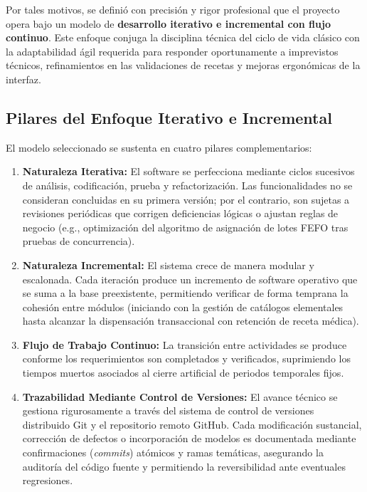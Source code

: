 Por tales motivos, se definió con precisión y rigor profesional que el proyecto opera bajo un modelo de \textbf{desarrollo iterativo e incremental con flujo continuo}. Este enfoque conjuga la disciplina técnica del ciclo de vida clásico con la adaptabilidad ágil requerida para responder oportunamente a imprevistos técnicos, refinamientos en las validaciones de recetas y mejoras ergonómicas de la interfaz.

\subsection{Pilares del Enfoque Iterativo e Incremental}

El modelo seleccionado se sustenta en cuatro pilares complementarios:

\begin{enumerate}
    \item \textbf{Naturaleza Iterativa:} El software se perfecciona mediante ciclos sucesivos de análisis, codificación, prueba y refactorización. Las funcionalidades no se consideran concluidas en su primera versión; por el contrario, son sujetas a revisiones periódicas que corrigen deficiencias lógicas o ajustan reglas de negocio (e.g., optimización del algoritmo de asignación de lotes FEFO tras pruebas de concurrencia).
    \item \textbf{Naturaleza Incremental:} El sistema crece de manera modular y escalonada. Cada iteración produce un incremento de software operativo que se suma a la base preexistente, permitiendo verificar de forma temprana la cohesión entre módulos (iniciando con la gestión de catálogos elementales hasta alcanzar la dispensación transaccional con retención de receta médica).
    \item \textbf{Flujo de Trabajo Continuo:} La transición entre actividades se produce conforme los requerimientos son completados y verificados, suprimiendo los tiempos muertos asociados al cierre artificial de periodos temporales fijos.
    \item \textbf{Trazabilidad Mediante Control de Versiones:} El avance técnico se gestiona rigurosamente a través del sistema de control de versiones distribuido Git y el repositorio remoto GitHub. Cada modificación sustancial, corrección de defectos o incorporación de modelos es documentada mediante confirmaciones (\textit{commits}) atómicos y ramas temáticas, asegurando la auditoría del código fuente y permitiendo la reversibilidad ante eventuales regresiones.
\end{enumerate}

